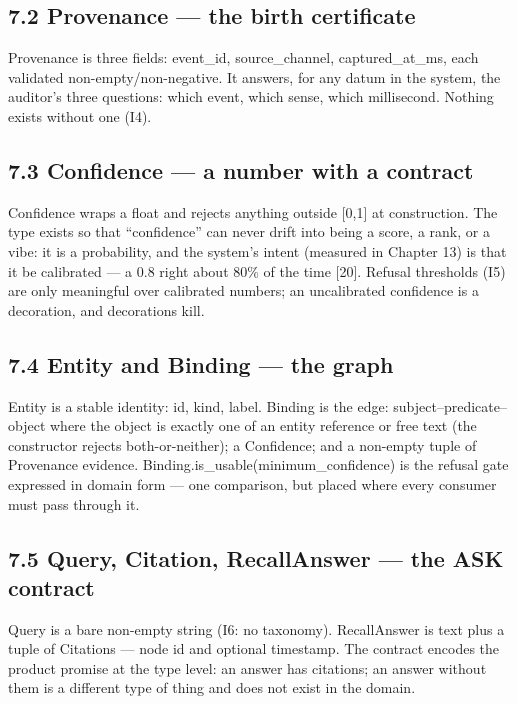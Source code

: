 \subsection{7.2 Provenance --- the birth certificate}\label{provenance-the-birth-certificate}

Provenance is three fields: event\_id, source\_channel, captured\_at\_ms, each validated non-empty/non-negative. It answers, for any datum in the system, the auditor's three questions: which event, which sense, which millisecond. Nothing exists without one (I4).

\subsection{7.3 Confidence --- a number with a contract}\label{confidence-a-number-with-a-contract}

Confidence wraps a float and rejects anything outside {[}0,1{]} at construction. The type exists so that ``confidence'' can never drift into being a score, a rank, or a vibe: it is a probability, and the system's intent (measured in Chapter 13) is that it be calibrated --- a 0.8 right about 80\% of the time {[}20{]}. Refusal thresholds (I5) are only meaningful over calibrated numbers; an uncalibrated confidence is a decoration, and decorations kill.

\subsection{7.4 Entity and Binding --- the graph}\label{entity-and-binding-the-graph}

Entity is a stable identity: id, kind, label. Binding is the edge: subject--predicate--object where the object is exactly one of an entity reference or free text (the constructor rejects both-or-neither); a Confidence; and a non-empty tuple of Provenance evidence. Binding.is\_usable(minimum\_confidence) is the refusal gate expressed in domain form --- one comparison, but placed where every consumer must pass through it.

\subsection{7.5 Query, Citation, RecallAnswer --- the ASK contract}\label{query-citation-recallanswer-the-ask-contract}

Query is a bare non-empty string (I6: no taxonomy). RecallAnswer is text plus a tuple of Citations --- node id and optional timestamp. The contract encodes the product promise at the type level: an answer has citations; an answer without them is a different type of thing and does not exist in the domain.

